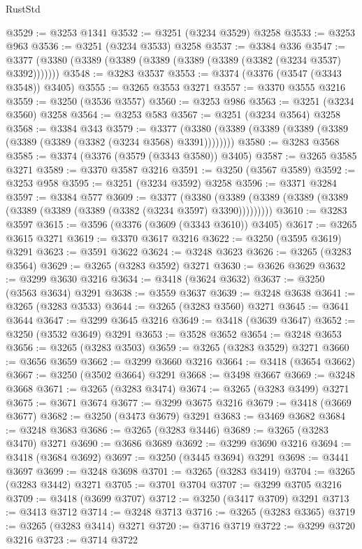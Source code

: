 \begin{lexlean}{RustStd}
\begin{coremodule}
@3529 := @3253 @1341
@3532 := @3251 (@3234 @3529) @3258
@3533 := @3253 @963
@3536 := @3251 (@3234 @3533) @3258
@3537 := @3384 @336
@3547 := @3377 (@3380 (@3389 (@3389 (@3389 (@3389 (@3389 (@3382 (@3234 @3537) @3392)))))))
@3548 := @3283 @3537
@3553 := @3374 (@3376 (@3547 (@3343 @3548)) @3405)
@3555 := @3265 @3553 @3271
@3557 := @3370 @3555 @3216
@3559 := @3250 (@3536 @3557)
@3560 := @3253 @986
@3563 := @3251 (@3234 @3560) @3258
@3564 := @3253 @583
@3567 := @3251 (@3234 @3564) @3258
@3568 := @3384 @343
@3579 := @3377 (@3380 (@3389 (@3389 (@3389 (@3389 (@3389 (@3389 (@3382 (@3234 @3568) @3391))))))))
@3580 := @3283 @3568
@3585 := @3374 (@3376 (@3579 (@3343 @3580)) @3405)
@3587 := @3265 @3585 @3271
@3589 := @3370 @3587 @3216
@3591 := @3250 (@3567 @3589)
@3592 := @3253 @958
@3595 := @3251 (@3234 @3592) @3258
@3596 := @3371 @3284
@3597 := @3384 @577
@3609 := @3377
    (@3380 (@3389 (@3389 (@3389 (@3389 (@3389 (@3389 (@3389 (@3382 (@3234 @3597) @3390)))))))))
@3610 := @3283 @3597
@3615 := @3596 (@3376 (@3609 (@3343 @3610)) @3405)
@3617 := @3265 @3615 @3271
@3619 := @3370 @3617 @3216
@3622 := @3250 (@3595 @3619) @3291
@3623 := @3591 @3622
@3624 := @3248 @3623
@3626 := @3265 (@3283 @3564)
@3629 := @3265 (@3283 @3592) @3271
@3630 := @3626 @3629
@3632 := @3299 @3630 @3216
@3634 := @3418 (@3624 @3632)
@3637 := @3250 (@3563 @3634) @3291
@3638 := @3559 @3637
@3639 := @3248 @3638
@3641 := @3265 (@3283 @3533)
@3644 := @3265 (@3283 @3560) @3271
@3645 := @3641 @3644
@3647 := @3299 @3645 @3216
@3649 := @3418 (@3639 @3647)
@3652 := @3250 (@3532 @3649) @3291
@3653 := @3528 @3652
@3654 := @3248 @3653
@3656 := @3265 (@3283 @3503)
@3659 := @3265 (@3283 @3529) @3271
@3660 := @3656 @3659
@3662 := @3299 @3660 @3216
@3664 := @3418 (@3654 @3662)
@3667 := @3250 (@3502 @3664) @3291
@3668 := @3498 @3667
@3669 := @3248 @3668
@3671 := @3265 (@3283 @3474)
@3674 := @3265 (@3283 @3499) @3271
@3675 := @3671 @3674
@3677 := @3299 @3675 @3216
@3679 := @3418 (@3669 @3677)
@3682 := @3250 (@3473 @3679) @3291
@3683 := @3469 @3682
@3684 := @3248 @3683
@3686 := @3265 (@3283 @3446)
@3689 := @3265 (@3283 @3470) @3271
@3690 := @3686 @3689
@3692 := @3299 @3690 @3216
@3694 := @3418 (@3684 @3692)
@3697 := @3250 (@3445 @3694) @3291
@3698 := @3441 @3697
@3699 := @3248 @3698
@3701 := @3265 (@3283 @3419)
@3704 := @3265 (@3283 @3442) @3271
@3705 := @3701 @3704
@3707 := @3299 @3705 @3216
@3709 := @3418 (@3699 @3707)
@3712 := @3250 (@3417 @3709) @3291
@3713 := @3413 @3712
@3714 := @3248 @3713
@3716 := @3265 (@3283 @3365)
@3719 := @3265 (@3283 @3414) @3271
@3720 := @3716 @3719
@3722 := @3299 @3720 @3216
@3723 := @3714 @3722

\end{coremodule}
\end{lexlean}
